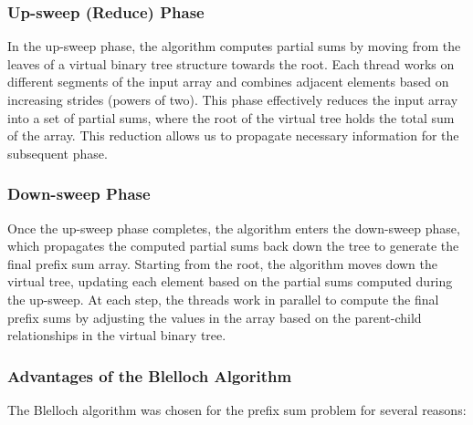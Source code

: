 \documentclass[letterpaper,12pt]{article}
\theoremstyle{remark}
\begin{document}
\subsubsection*{Up-sweep (Reduce) Phase}
In the up-sweep phase, the algorithm computes partial sums by moving from the leaves of a virtual binary tree structure towards the root. Each thread works on different segments of the input array and combines adjacent elements based on increasing strides (powers of two). This phase effectively reduces the input array into a set of partial sums, where the root of the virtual tree holds the total sum of the array. This reduction allows us to propagate necessary information for the subsequent phase.

\subsubsection*{Down-sweep Phase}
Once the up-sweep phase completes, the algorithm enters the down-sweep phase, which propagates the computed partial sums back down the tree to generate the final prefix sum array. Starting from the root, the algorithm moves down the virtual tree, updating each element based on the partial sums computed during the up-sweep. At each step, the threads work in parallel to compute the final prefix sums by adjusting the values in the array based on the parent-child relationships in the virtual binary tree.

\subsubsection*{Advantages of the Blelloch Algorithm}

The Blelloch algorithm was chosen for the prefix sum problem for several reasons:
\end{document}
